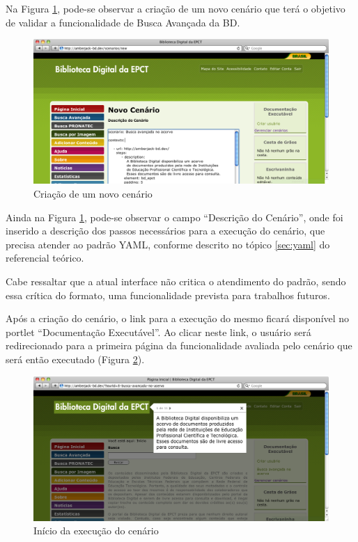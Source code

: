 Na Figura \ref{tour_3}, pode-se observar a criação de um novo cenário que terá o objetivo de validar a funcionalidade de Busca Avançada da BD.

\begin{figure}[ht]
    \centering
    \includegraphics[width=0.9 \textwidth]{figuras/tour_3}
    \caption{Criação de um novo cenário}
    \label{tour_3}
\end{figure}

Ainda na Figura \ref{tour_3}, pode-se observar o campo “Descrição do Cenário”, onde foi inserido a descrição dos passos necessários para a execução do cenário, que precisa atender ao padrão YAML, conforme descrito no  tópico \ref{sec:yaml} do referencial teórico.

Cabe ressaltar que a atual interface não critica o atendimento do padrão, sendo essa crítica do formato, uma funcionalidade prevista para  trabalhos futuros.

Após a criação do cenário, o link para a execução do mesmo ficará disponível no portlet “Documentação Executável”. Ao clicar neste link, o usuário será redirecionado para a primeira página da funcionalidade avaliada pelo cenário que será então executado (Figura \ref{tour_4}).

\begin{figure}[ht]
    \centering
    \includegraphics[width=0.9 \textwidth]{figuras/tour_4}
    \caption{Início da execução do cenário}
    \label{tour_4}
\end{figure}

